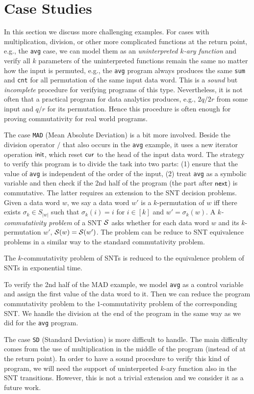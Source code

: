 \section{Case Studies}
\label{sec:cases}



In this section we discuss more challenging examples. 
For cases with multiplication, division, or other more complicated functions at the return point, e.g., the \texttt{avg} case, we can model them as an \emph{uninterpreted $k$-ary function} and verify all $k$ parameters of the uninterpreted functions remain the same no matter how the input is permuted, e.g., the \texttt{avg} program always produces the same \texttt{sum} and \texttt{cnt} for all permutation of the same input data word. This is a \emph{sound} but \emph{incomplete} procedure for verifying programs of this type. Nevertheless, it is not often that a  practical program for data analytics produces, e.g., $2q/2r$ from some input and $q/r$ for its permutation. Hence this procedure is often enough for proving commutativity for real world programs.

The case \texttt{MAD} (Mean Absolute Deviation) is a bit more involved. Beside the division operator $/$ that also occurs in the \texttt{avg} example, it uses a new iterator operation $\mathsf{init}$, which reset $\mathsf{cur}$ to the head of the input data word. The strategy to verify this program is to divide the task into two parts: (1) ensure that the value of \texttt{avg} is independent of the order of the input, (2) treat \texttt{avg} as a symbolic variable and then check if the 2nd half of the program (the part after $\mathsf{next}$) is commutative. The latter requires an extension to the SNT decision problems. Given a data word $w$, we say a data word $w'$ is a $k$-permutation of $w$ iff there exists $\sigma_k\in S_{|w|}$ such that $\sigma_k(i)=i$ for $i \in [k]$ and $w'=\sigma_k(w)$. A \emph{$k$-commutativity problem} of a SNT ${\mathcal{S} }$ asks whether for each data word $w$ and its $k$-permutation $w'$, ${\mathcal{S} }(w)={\mathcal{S} }(w')$. The problem can be reduce to SNT equivalence problems in a similar way to the standard commutativity problem.

\begin{proposition}\label{prop-snt-kcmm-to-eqv}
	The $k$-commutativity problem of SNTs is reduced to the equivalence problem of SNTs in exponential time. 
\end{proposition}

To verify the 2nd half of the MAD example, we model \texttt{avg} as a control variable and assign the first value of the data word to it. Then we can reduce the program commutativity problem to the $1$-commutativity problem of the corresponding SNT. We handle the division at the end of the program in the same way as we did for the \texttt{avg} program.

The case \texttt{SD} (Standard Deviation) is more difficult to handle. The main difficulty comes from the use of multiplication in the middle of the program (instead of at the return point). In order to have a sound procedure to verify this kind of program, we will need the support of uninterpreted $k$-ary function also in the SNT transitions. However, this is not a trivial extension and we consider it as a future work.


